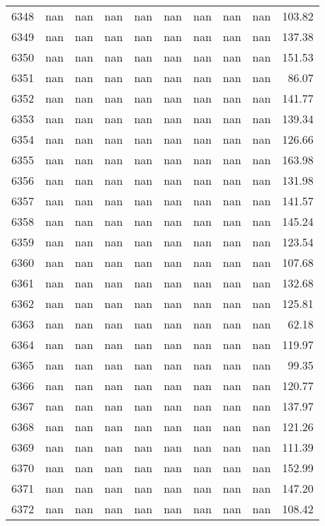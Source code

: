 \begin{tabular}{lrrrrrrrrr}
6348 & nan & nan & nan & nan & nan & nan & nan & nan & 103.82 \\
6349 & nan & nan & nan & nan & nan & nan & nan & nan & 137.38 \\
6350 & nan & nan & nan & nan & nan & nan & nan & nan & 151.53 \\
6351 & nan & nan & nan & nan & nan & nan & nan & nan & 86.07 \\
6352 & nan & nan & nan & nan & nan & nan & nan & nan & 141.77 \\
6353 & nan & nan & nan & nan & nan & nan & nan & nan & 139.34 \\
6354 & nan & nan & nan & nan & nan & nan & nan & nan & 126.66 \\
6355 & nan & nan & nan & nan & nan & nan & nan & nan & 163.98 \\
6356 & nan & nan & nan & nan & nan & nan & nan & nan & 131.98 \\
6357 & nan & nan & nan & nan & nan & nan & nan & nan & 141.57 \\
6358 & nan & nan & nan & nan & nan & nan & nan & nan & 145.24 \\
6359 & nan & nan & nan & nan & nan & nan & nan & nan & 123.54 \\
6360 & nan & nan & nan & nan & nan & nan & nan & nan & 107.68 \\
6361 & nan & nan & nan & nan & nan & nan & nan & nan & 132.68 \\
6362 & nan & nan & nan & nan & nan & nan & nan & nan & 125.81 \\
6363 & nan & nan & nan & nan & nan & nan & nan & nan & 62.18 \\
6364 & nan & nan & nan & nan & nan & nan & nan & nan & 119.97 \\
6365 & nan & nan & nan & nan & nan & nan & nan & nan & 99.35 \\
6366 & nan & nan & nan & nan & nan & nan & nan & nan & 120.77 \\
6367 & nan & nan & nan & nan & nan & nan & nan & nan & 137.97 \\
6368 & nan & nan & nan & nan & nan & nan & nan & nan & 121.26 \\
6369 & nan & nan & nan & nan & nan & nan & nan & nan & 111.39 \\
6370 & nan & nan & nan & nan & nan & nan & nan & nan & 152.99 \\
6371 & nan & nan & nan & nan & nan & nan & nan & nan & 147.20 \\
6372 & nan & nan & nan & nan & nan & nan & nan & nan & 108.42 \\

\end{tabular}
